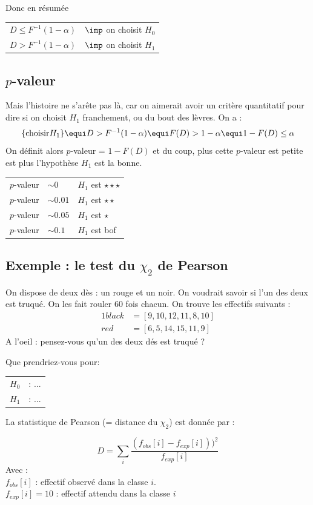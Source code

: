 \documentclass{article}
\begin{document}
Donc en résumée
\begin{tabular}{ll}
$D \leq  F^{-1}(1-\alpha)$   &$\imp$    on choisit $H_0$ \\
$D > F^{-1}(1-\alpha)$    &$\imp$   on choisit $H_1$
\end{tabular}


\subsection{$p$-valeur}

Mais l'histoire ne s'arête pas là, car on aimerait avoir un critère quantitatif pour dire si on choisit $H_1$ franchement, ou du bout des lèvres. On a :
$$
\{\mathrm{choisir } H_1\} \equi D > F^{-1}(1-\alpha) \equi F(D) >1- \alpha \equi 1 -F(D) \leq \alpha
$$
On définit alors $p$-valeur =  $1 -F(D)$ et du coup, plus cette $p$-valeur est petite est plus l'hypothèse $H_1$ est la bonne. 

\begin{tabular}{lll}
$p$-valeur & $\sim  0$    &$H_1$ est $\star\star\star$ \\
$p$-valeur & $\sim  0.01$    &$H_1$ est $\star\star$ \\
$p$-valeur & $\sim  0.05$    &$H_1$ est $\star$ \\
$p$-valeur & $\sim  0.1$    &$H_1$ est  bof 
\end{tabular}


\subsection{Exemple : le test du $\chi_2$ de Pearson}

On dispose de deux dès : un rouge et un noir.
On voudrait savoir si l'un des deux est truqué.
On les fait rouler 60 fois chacun. On trouve les effectifs suivants : 
\begin{alignat*}{1}
black &= [9, 10, 12, 11, 8, 10]\\
red &=  [6, 5, 14, 15, 11, 9]
\end{alignat*}
A l'oeil :  pensez-vous qu'un des deux dés est truqué ?

Que prendriez-vous pour:
  \begin{tabular}{ll}
$H_0$  &:   ... \\
$H_1$  & :  ...
\end{tabular}

      
 La statistique  de Pearson (= distance du $\chi_2$) est donnée par :

$$
D= \sum_i \frac{ (f_{obs}[i] - f_{exp}[i] ) )^2 }{ f_{exp}[i] }
$$
Avec :\\
$ f_{obs}[i]$  : effectif observé dans la classe $i$. \\
$f_{exp}[i]=10$ : effectif attendu dans la classe $i$
\end{document}
